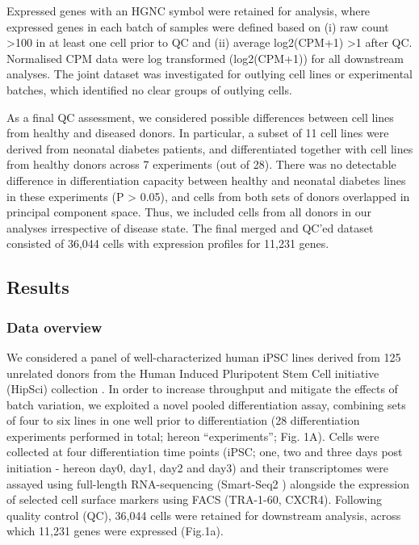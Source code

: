 Expressed genes with an HGNC symbol were retained for analysis, where expressed genes in each batch of samples were defined based on (i) raw count >100 in at least one cell prior to QC and (ii) average log2(CPM+1) >1 after QC. 
Normalised CPM data were log transformed (log2(CPM+1)) for all downstream analyses. 
The joint dataset was investigated for outlying cell lines or experimental batches, which identified no clear groups of outlying cells. 

As a final QC assessment, we considered possible differences between cell lines from healthy and diseased donors. 
In particular, a subset of 11 cell lines were derived from neonatal diabetes patients, and differentiated together with cell lines from healthy donors across 7 experiments (out of 28). 
There was no detectable difference in differentiation capacity between healthy and neonatal diabetes lines in these experiments (P > 0.05), and cells from both sets of donors overlapped in principal component space. 
Thus, we included cells from all donors in our analyses irrespective of disease state.
The final merged and QC’ed dataset consisted of 36,044 cells with expression profiles for 11,231 genes.


\subsection{Results}

\subsubsection{Data overview}

 We considered a panel of well-characterized human iPSC lines derived from 125 unrelated donors from the Human Induced Pluripotent Stem Cell initiative (HipSci) collection \cite{kilpinen2017common}. 
 In order to increase throughput and mitigate the effects of batch variation, we exploited a novel pooled differentiation assay, combining sets of four to six lines in one well prior to differentiation (28 differentiation experiments performed in total; hereon “experiments”; Fig. 1A). 
 Cells were collected at four differentiation time points (iPSC; one, two and three days post initiation - hereon day0, day1, day2 and day3) and their transcriptomes were assayed using full-length RNA-sequencing (Smart-Seq2 \cite{picelli2013smart}) alongside the expression of selected cell surface markers using FACS (TRA-1-60, CXCR4). 
 Following quality control (QC), 36,044 cells were retained for downstream analysis, across which 11,231 genes were expressed (Fig.1a).
 
